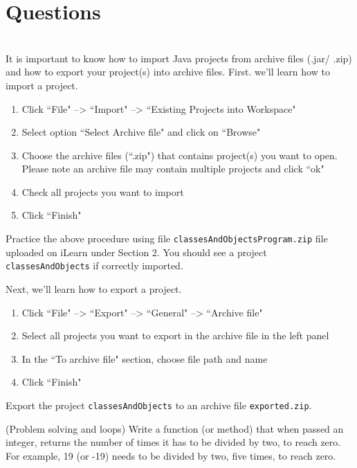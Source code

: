 \section*{Questions}

\begin{questions}

\\
 
It is important to know how to import Java projects from archive files (.jar/ .zip) and how to export your project(s) into archive files. First. we'll learn how to import a project.

\begin{enumerate}
\item Click ``File" --> ``Import" --> ``Existing Projects into Workspace"
\item Select option ``Select Archive file" and click on ``Browse"
\item Choose the archive files (``.zip") that contains project(s) you want to open. Please note an archive file may contain multiple projects and click ``ok"
\item Check all projects you want to import
\item Click ``Finish"
\end{enumerate}

Practice the above procedure using file \texttt{classesAndObjectsProgram.zip} file uploaded on iLearn under Section 2. You should see a project \texttt{classesAndObjects} if correctly imported.

Next, we'll learn how to export a project.

\begin{enumerate}
\item Click ``File" --> ``Export" --> ``General" --> ``Archive file"
\item Select all projects you want to export in the archive file in the left panel
\item In the ``To archive file" section, choose file path and name
\item Click ``Finish"
\end{enumerate}

Export the project \texttt{classesAndObjects} to an archive file \texttt{exported.zip}.

\question (Problem solving and loops) Write a function (or method) that when passed an integer, returns the number of times it has to be divided by two, to reach zero. For example, 19 (or -19) needs to be divided by two, five times, to reach zero. 


\end{questions}
